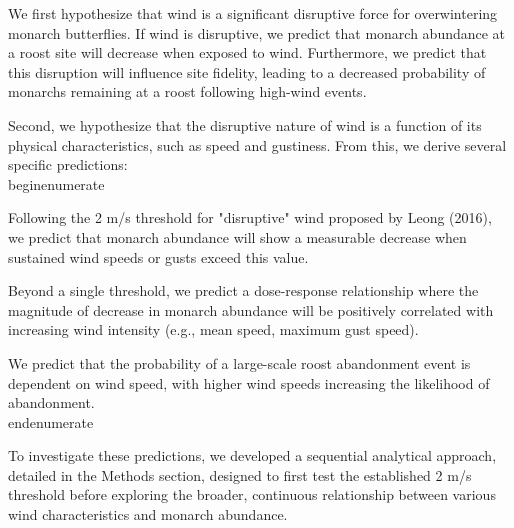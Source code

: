 We first hypothesize that wind is a significant disruptive force for overwintering monarch butterflies. If wind is disruptive, we predict that monarch abundance at a roost site will decrease when exposed to wind. Furthermore, we predict that this disruption will influence site fidelity, leading to a decreased probability of monarchs remaining at a roost following high-wind events.

Second, we hypothesize that the disruptive nature of wind is a function of its physical characteristics, such as speed and gustiness. From this, we derive several specific predictions:
\\begin{enumerate}
    \item Following the 2 m/s threshold for "disruptive" wind proposed by Leong (2016), we predict that monarch abundance will show a measurable decrease when sustained wind speeds or gusts exceed this value.
    \item Beyond a single threshold, we predict a dose-response relationship where the magnitude of decrease in monarch abundance will be positively correlated with increasing wind intensity (e.g., mean speed, maximum gust speed).
    \item We predict that the probability of a large-scale roost abandonment event is dependent on wind speed, with higher wind speeds increasing the likelihood of abandonment.
\\end{enumerate}

To investigate these predictions, we developed a sequential analytical approach, detailed in the Methods section, designed to first test the established 2 m/s threshold before exploring the broader, continuous relationship between various wind characteristics and monarch abundance.